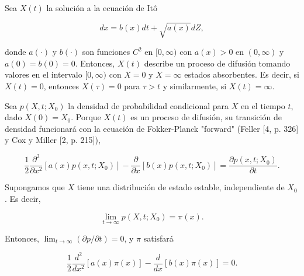 \documentclass[a4paper,12pt]{article}
\begin{document}
Sea \( X(t) \) la solución a la ecuación de Itô

\[
dx = b(x)dt + \sqrt{a(x)} dZ,
\]

donde \( a(\cdot) \) y \( b(\cdot) \) son funciones \( C^2 \) en \([0, \infty)\) con \( a(x) > 0 \) en \((0, \infty)\) y \( a(0) = b(0) = 0 \). Entonces, \( X(t) \) describe un proceso de difusión tomando valores en el intervalo \([0, \infty)\) con \( X = 0 \) y \( X = \infty \) estados absorbentes. Es decir, si \( X(t) = 0 \), entonces \( X(\tau) = 0 \) para \( \tau > t \) y similarmente, si \( X(t) = \infty \).

Sea \( p(X, t; X_0) \) la densidad de probabilidad condicional para \( X \) en el tiempo \( t \), dado \( X(0) = X_0 \). Porque \( X(t) \) es un proceso de difusión, su transición de densidad funcionará con la ecuación de Fokker-Planck "forward" (Feller [4, p. 326] y Cox y Miller [2, p. 215]),

\[
\frac{1}{2} \frac{\partial^2}{\partial x^2} [a(x)p(x, t; X_0)] - \frac{\partial}{\partial x} [b(x)p(x, t; X_0)] = \frac{\partial p(x, t; X_0)}{\partial t}.
\]

Supongamos que \( X \) tiene una distribución de estado estable, independiente de \( X_0 \). Es decir,

\[
\lim_{t \to \infty} p(X, t; X_0) = \pi(x).
\]

Entonces, \(\lim_{t \to \infty} (\partial p / \partial t) = 0\), y \(\pi\) satisfará

\[
\frac{1}{2} \frac{d^2}{dx^2} [a(x)\pi(x)] - \frac{d}{dx} [b(x)\pi(x)] = 0.
\]
\end{document}
